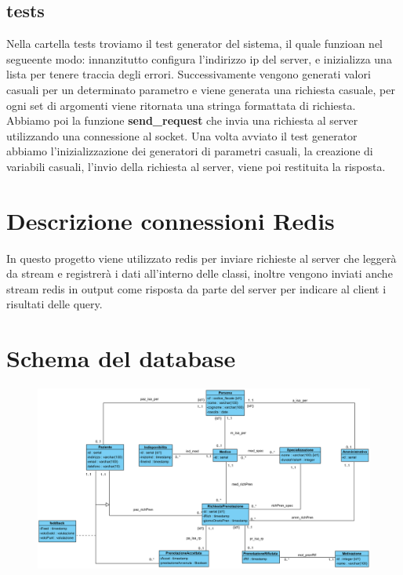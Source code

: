 \documentclass[12pt]{report}
\begin{document}
    \subsection{tests}
    Nella cartella tests troviamo il test generator del sistema, il quale funzioan nel segueente modo: innanzitutto configura l'indirizzo ip  del server, e inizializza una lista per tenere traccia degli errori. Successivamente vengono generati valori casuali per un determinato parametro e viene generata una richiesta casuale, per ogni set di argomenti viene ritornata una stringa formattata di richiesta. Abbiamo poi la funzione \textbf{send\_request} che invia una richiesta al server utilizzando una connessione al socket. Una volta avviato il test generator abbiamo l'inizializzazione dei generatori di parametri casuali, la creazione di variabili casuali, l'invio della richiesta al server, viene poi restituita la risposta.
    
    
    \section{Descrizione connessioni Redis}
    In questo progetto viene utilizzato redis per inviare richieste al server che leggerà da stream e registrerà i dati all'interno delle classi, inoltre vengono inviati anche stream redis in output come risposta da parte del server per indicare al client i risultati delle query. 
    
    \section{Schema del database}
    \begin{figure}[H]
        \centering
        \includegraphics[width=1\linewidth]{images/UML prenotazionimediche ristrutturato.png}
        \label{UML prenotazionimediche ristrutturato}
    \end{figure}
\end{document}
